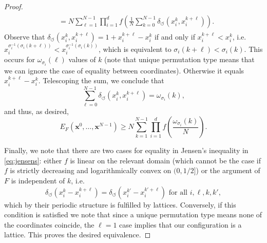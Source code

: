 \documentclass[a4paper,12pt]{article}
\numberwithin{equation}{section}
\theoremstyle{definition}
\newcommand{\bx}{\mathbf{x}}
\begin{document}
\begin{proof}
\begin{align}
\begin{split}
    & = N\sum_{\ell=1}^{N-1}\prod_{i=1}^d f\left(\frac{1}{N}\sum_{k=0}^{N-1}\delta_\circlearrowleft(x_i^k,x_i^{k+\ell})\right).
     \end{split}
    \end{align}
 Observe that $\delta_\circlearrowleft(x_i^k,x_i^{k+\ell})= 1+x_i^{k+\ell}-x_i^k$ if and only if 
 $x_i^{k+\ell}<x_i^k$, i.e.  $x_i^{\sigma^{-1}_i(\sigma_i(k+\ell))}<x_i^{\sigma^{-1}_i(\sigma_i(k))}$, which is equivalent to  $\sigma_i(k+\ell)<\sigma_i(k)$. This  occurs for $\omega_{\sigma_i}(\ell)$ values of $k$ (note that unique permutation type means that we can ignore the case of equality between coordinates). Otherwise it equals $x_i^{k+\ell}-x_i^k$. Telescoping the sum, we  conclude that 
 $$ \sum_{\ell=0}^{N-1}\delta_\circlearrowleft(x_i^k,x_i^{k+\ell}) = {\omega_{\sigma_i}(k)},$$ and thus, as desired,  $$E_F(\bx^0,\dots,\bx^{N-1})\ge N\sum_{k=1}^{N-1}\prod_{i=1}^df\left(\frac{\omega_{\sigma_i}(k)}{N}\right).$$
    
    Finally, we note that there are two cases for equality in Jensen's inequality in \eqref{eq:jensens}: either $f$ is linear on the relevant domain (which cannot be the case if $f$ is strictly decreasing and logarithmically convex on $(0,1/2]$) or the argument of $F$ is independent of $k$, i.e. \begin{equation*}%
       \delta_\circlearrowleft(x_i^k-x_i^{k+\ell})=\delta_\circlearrowleft(x_i^{k'}-x_i^{k'+\ell})\text{ for all }i, \ell, k,k' ,
    \end{equation*} which by their periodic structure is fulfilled by lattices. Conversely, if this condition is satisfied we note that since a unique permutation type means none of the coordinates coincide, the $\ell=1$ case implies that our configuration is a lattice. This proves the desired equivalence.%
\end{proof}
\end{document}

